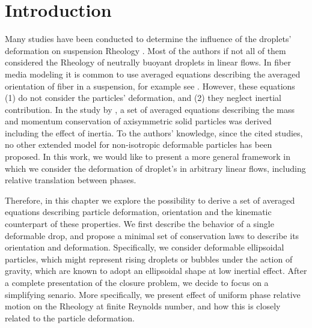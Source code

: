 \section{Introduction}
\label{sec:intro_ellipse}
Many studies have been conducted to determine the influence of the droplets' deformation on suspension Rheology \citet{goddard1967nonlinear,lhuillier1987phenomenology,maffettone1998equation,raja2010inertial}.
Most of the authors if not all of them considered the Rheology of neutrally buoyant droplets in linear flows. 
In fiber media modeling it is common to use averaged equations describing the averaged orientation of fiber in a suspension, for example see \citep{wang2008objective}. 
However, these equations (1) do not consider the particles' deformation, and (2) they neglect inertial contribution. 
In the study by \citet{curtiss1956kinetic}, a set of averaged equations describing the mass and momentum conservation of axisymmetric solid particles was derived including the effect of inertia. 
To the authors' knowledge, since the cited studies, no other extended model for non-isotropic deformable particles has been proposed. 
In this work, we would like to present a more general framework in which we consider the deformation of droplet's in arbitrary linear flows, including relative translation between phases. 

Therefore, in this chapter we explore the possibility to derive a set of averaged equations describing particle deformation, orientation and the kinematic counterpart of these properties. 
We first describe the behavior of a single deformable drop, and propose a minimal set of conservation laws to describe its orientation and deformation. 
Specifically, we consider deformable ellipsoidal particles, which might represent rising droplets or bubbles under the action of gravity, which are known to adopt an ellipsoidal shape \citep{taylor1964deformation} at low inertial effect.
After a complete presentation of the closure problem, we decide to focus on a simplifying senario. 
More specifically, we present effect of uniform phase relative motion on the Rheology at finite Reynolds number, and how this is closely related to the particle deformation. 



